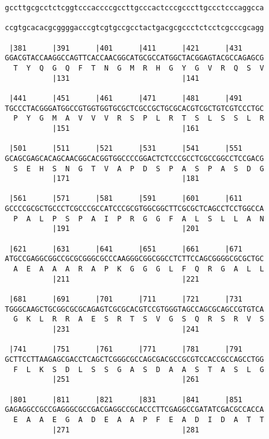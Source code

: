 \documentclass{article}
\begin{document}
\begin{Verbatim}
gccttgcgcctctcggtcccaccccgccttgcccactcccgcccttgccctcccaggcca
                                                            
ccgtgcacacgcggggacccgtcgtgccgcctactgacgcgccctctcctcgcccgcagg
                                                            
 |381      |391      |401      |411      |421      |431     
GGACGTACCAAGGCCAGTTCACCAACGGCATGCGCCATGGCTACGGAGTACGCCAGAGCG
  T  Y  Q  G  Q  F  T  N  G  M  R  H  G  Y  G  V  R  Q  S  V
           |131                          |141               
  
 |441      |451      |461      |471      |481      |491     
TGCCCTACGGGATGGCCGTGGTGGTGCGCTCGCCGCTGCGCACGTCGCTGTCGTCCCTGC
  P  Y  G  M  A  V  V  V  R  S  P  L  R  T  S  L  S  S  L  R
           |151                          |161               
  
 |501      |511      |521      |531      |541      |551     
GCAGCGAGCACAGCAACGGCACGGTGGCCCCGGACTCTCCCGCCTCGCCGGCCTCCGACG
  S  E  H  S  N  G  T  V  A  P  D  S  P  A  S  P  A  S  D  G
           |171                          |181               
  
 |561      |571      |581      |591      |601      |611     
GCCCCGCGCTGCCCTCGCCCGCCATCCCGCGTGGCGGCTTCGCGCTCAGCCTCCTGGCCA
  P  A  L  P  S  P  A  I  P  R  G  G  F  A  L  S  L  L  A  N
           |191                          |201               
  
 |621      |631      |641      |651      |661      |671     
ATGCCGAGGCGGCCGCGCGGGCGCCCAAGGGCGGCGGCCTCTTCCAGCGGGGCGCGCTGC
  A  E  A  A  A  R  A  P  K  G  G  G  L  F  Q  R  G  A  L  L
           |211                          |221               
  
 |681      |691      |701      |711      |721      |731     
TGGGCAAGCTGCGGCGCGCAGAGTCGCGCACGTCCGTGGGTAGCCAGCGCAGCCGTGTCA
  G  K  L  R  R  A  E  S  R  T  S  V  G  S  Q  R  S  R  V  S
           |231                          |241               
  
 |741      |751      |761      |771      |781      |791     
GCTTCCTTAAGAGCGACCTCAGCTCGGGCGCCAGCGACGCCGCGTCCACCGCCAGCCTGG
  F  L  K  S  D  L  S  S  G  A  S  D  A  A  S  T  A  S  L  G
           |251                          |261               
  
 |801      |811      |821      |831      |841      |851     
GAGAGGCCGCCGAGGGCGCCGACGAGGCCGCACCCTTCGAGGCCGATATCGACGCCACCA
  E  A  A  E  G  A  D  E  A  A  P  F  E  A  D  I  D  A  T  T
           |271                          |281               
  

\end{Verbatim}
\end{document}
